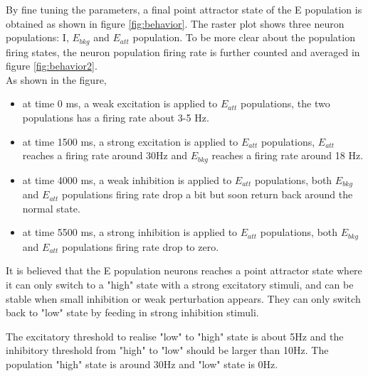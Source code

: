 By fine tuning the parameters, a final point attractor state of the E population is obtained as 
shown in figure \ref{fig:behavior}.
The raster plot shows three neuron populations: I, $E_{bkg}$ and $E_{att}$ population. 
To be more clear about the population firing states, the neuron population firing rate is further counted and averaged in figure \ref{fig:behavior2}.\\

As shown in the figure, 
\begin{itemize}
	\item at time 0 ms, a weak excitation is applied to $E_{att}$ populations, the two populations has a firing rate about 3-5 Hz.
	\item at time 1500 ms, a strong excitation is applied to $E_{att}$ populations, $E_{att}$ reaches a firing rate around 30Hz and $E_{bkg}$ reaches a firing rate around 18 Hz.
	\item at time 4000 ms, a weak inhibition is applied to $E_{att}$ populations, both $E_{bkg}$ and $E_{att}$ populations firing rate drop a bit but soon return back around the normal state.
	\item at time 5500 ms, a strong inhibition is applied to $E_{att}$ populations, both $E_{bkg}$ and $E_{att}$ populations firing rate drop to zero.
\end{itemize}

It is believed that the E population neurons reaches a point attractor state where it can only switch to a "high" state with a strong excitatory stimuli, and can be stable when small inhibition or weak perturbation appears. They can only switch back to "low" state by feeding in strong inhibition stimuli.

The excitatory threshold to realise "low" to "high" state is about 5Hz and the inhibitory threshold from "high" to "low" should be larger than 10Hz. The population "high" state is around 30Hz and "low" state is 0Hz.
